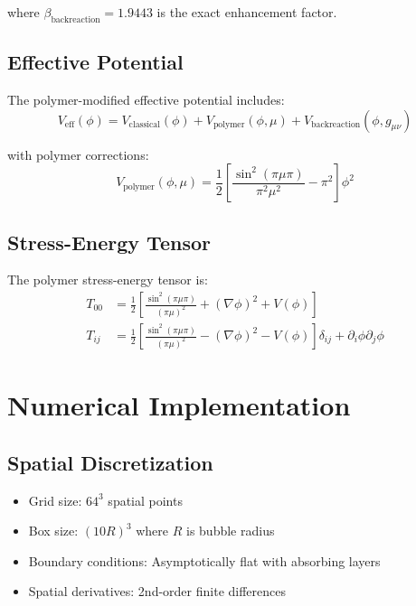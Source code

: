 \documentclass[11pt,a4paper]{article}
\begin{document}
where $\beta_{\text{backreaction}} = 1.9443$ is the exact enhancement factor.

\subsection{Effective Potential}

The polymer-modified effective potential includes:
\begin{equation}
V_{\text{eff}}(\phi) = V_{\text{classical}}(\phi) + V_{\text{polymer}}(\phi, \mu) + V_{\text{backreaction}}(\phi, g_{\mu\nu})
\end{equation}

with polymer corrections:
\begin{equation}
V_{\text{polymer}}(\phi, \mu) = \frac{1}{2} \left[\frac{\sin^2(\pi\mu\pi)}{\pi^2\mu^2} - \pi^2\right] \phi^2
\end{equation}

\subsection{Stress-Energy Tensor}

The polymer stress-energy tensor is:
\begin{align}
T_{00} &= \frac{1}{2}\left[\frac{\sin^2(\pi\mu\pi)}{(\pi\mu)^2} + (\nabla\phi)^2 + V(\phi)\right] \\
T_{ij} &= \frac{1}{2}\left[\frac{\sin^2(\pi\mu\pi)}{(\pi\mu)^2} - (\nabla\phi)^2 - V(\phi)\right] \delta_{ij} + \partial_i\phi \partial_j\phi
\end{align}

\section{Numerical Implementation}

\subsection{Spatial Discretization}

\begin{itemize}
\item Grid size: $64^3$ spatial points
\item Box size: $(10R)^3$ where $R$ is bubble radius
\item Boundary conditions: Asymptotically flat with absorbing layers
\item Spatial derivatives: 2nd-order finite differences
\end{itemize}
\end{document}
